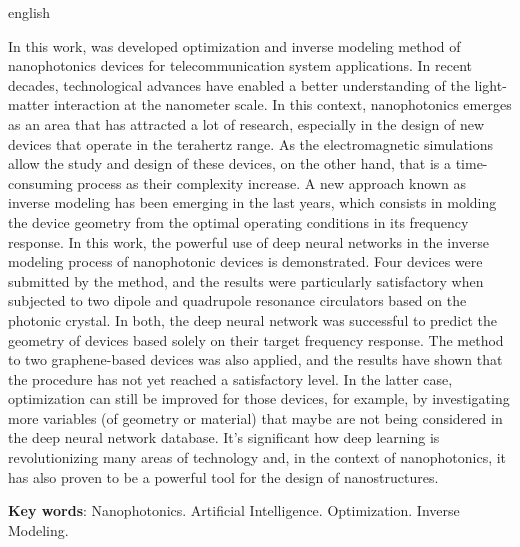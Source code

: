 

\begin{resumo}[Abstract]
\begin{otherlanguage*}{english}

In this work, was developed optimization and inverse modeling method of nanophotonics devices for telecommunication system applications. In recent decades, technological advances have enabled a better understanding of the light-matter interaction at the nanometer scale. In this context, nanophotonics emerges as an area that has attracted a lot of research, especially in the design of new devices that operate in the terahertz range. As the electromagnetic simulations allow the study and design of these devices, on the other hand, that is a time-consuming process as their complexity increase. A new approach known as inverse modeling has been emerging in the last years, which consists in molding the device geometry from the optimal operating conditions in its frequency response. In this work, the powerful use of deep neural networks in the inverse modeling process of nanophotonic devices is demonstrated. Four devices were submitted by the method, and the results were particularly satisfactory when subjected to two dipole and quadrupole resonance circulators based on the photonic crystal. In both, the deep neural network was successful to predict the geometry of devices based solely on their target frequency response. The method to two graphene-based devices was also applied, and the results have shown that the procedure has not yet reached a satisfactory level. In the latter case, optimization can still be improved for those devices, for example, by investigating more variables (of geometry or material) that maybe are not being considered in the deep neural network database. It's significant how deep learning is revolutionizing many areas of technology and, in the context of nanophotonics, it has also proven to be a powerful tool for the design of nanostructures.


\vspace{\onelineskip}
\noindent
\textbf{Key words}: Nanophotonics. Artificial Intelligence. Optimization. Inverse Modeling.
\end{otherlanguage*}
\end{resumo}

